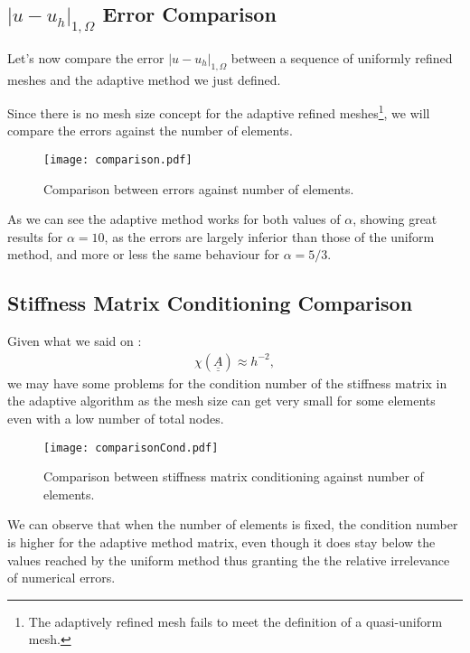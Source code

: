 \subsection[Error Comparison]{$|u - u_h|_{1, \Omega}$ Error Comparison}

Let's now compare the error $|u - u_h|_{1, \Omega}$ between a sequence of uniformly refined meshes and the adaptive method we just defined.

Since there is no mesh size concept for the adaptive refined meshes\footnote{The adaptively refined mesh fails to meet the definition of a quasi-uniform mesh.}, we will compare the errors against the number of elements.

\begin{figure}[!ht]
	\centering
	\texttt{[image: comparison.pdf]}
	\caption{Comparison between errors against number of elements.}
\end{figure}

As we can see the adaptive method works for both values of $\alpha$, showing great results for $\alpha = 10$, as the errors are largely inferior than those of the uniform method, and more or less the same behaviour for $\alpha = 5/3$.

\newpage
\begin{multicols}{2}
	
\end{multicols}

\newpage
\subsection{Stiffness Matrix Conditioning Comparison}

Given what we said on :
\begin{gather}
	\chi(\underline{\underline{A}}) \approx h^{-2},
\end{gather}
we may have some problems for the condition number of the stiffness matrix in the adaptive algorithm as the mesh size can get very small for some elements even with a low number of total nodes.

\begin{figure}[!ht]
	\centering
	\texttt{[image: comparisonCond.pdf]}
	\caption{Comparison between stiffness matrix conditioning against number of elements.}
\end{figure}

We can observe that when the number of elements is fixed, the condition number is higher for the adaptive method matrix, even though it does stay below the values reached by the uniform method thus granting the the relative irrelevance of numerical errors.

\newpage
\begin{multicols}{2}
	
\end{multicols}